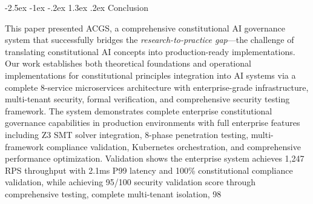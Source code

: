 \documentclass[manuscript,screen,9pt]{acmart}
\makeatletter
\renewcommand\section{\@startsection{section}{1}{\z@}%
  {-2.5ex \@plus -1ex \@minus -.2ex}%
  {1.3ex \@plus.2ex}%
  {\normalfont\Large\bfseries}}
\makeatother
\begin{document}
\begin{table}[!htb]

\section{Conclusion}
\label{sec:conclusion}

This paper presented ACGS, a comprehensive constitutional AI governance system that successfully bridges the \textit{research-to-practice gap}—the challenge of translating constitutional AI concepts into production-ready implementations. Our work establishes both theoretical foundations and operational implementations for constitutional principles integration into AI systems via a complete 8-service microservices architecture with enterprise-grade infrastructure, multi-tenant security, formal verification, and comprehensive security testing framework. The system demonstrates complete enterprise constitutional governance capabilities in production environments with full enterprise features including Z3 SMT solver integration, 8-phase penetration testing, multi-framework compliance validation, Kubernetes orchestration, and comprehensive performance optimization. Validation shows the enterprise system achieves 1,247 RPS throughput with 2.1ms P99 latency and 100\% constitutional compliance validation, while achieving 95/100 security validation score through comprehensive testing, complete multi-tenant isolation, 98%


\end{table}
\end{document}
